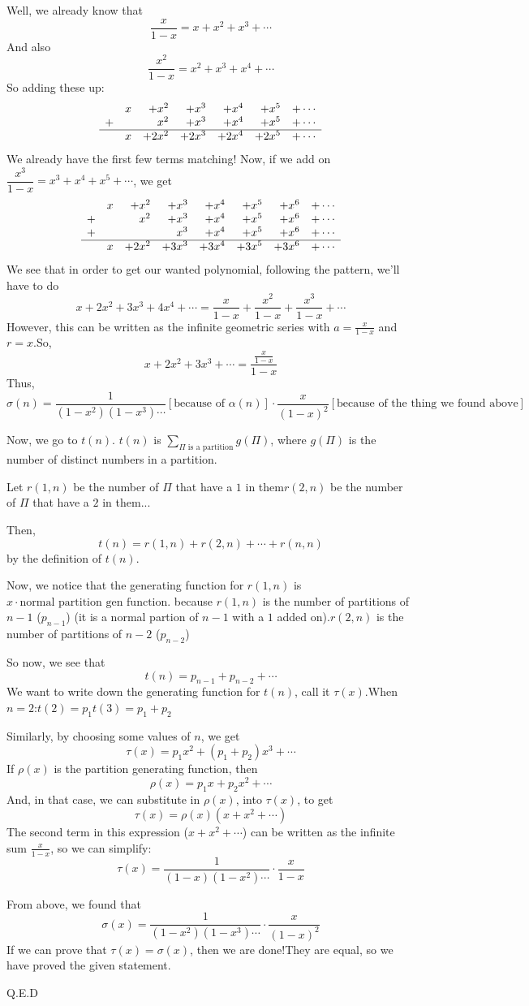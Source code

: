 \begin{enumerate}
 Well, we already know that 
 \[\frac{x}{1-x} = x+x^2+x^3 + \cdots\]And also 
 \[\frac{x^2}{1-x} = x^2+x^3+x^4+\cdots\]So adding these up:
 \[\begin{array}{rrrrrrr} & x & +x^2 & +x^3 & +x^4 & +x^5 & +\cdots \\ +&   & x^2 & +x^3 & +x^4 & +x^5 & +\cdots \\ \hline & x & +2x^2 & +2x^3 & +2x^4 & +2x^5 & +\cdots \end{array}\]We already have the first few terms matching! Now, if we add on $\dfrac{x^3}{1-x} = x^3+x^4+x^5+\cdots$, we get 
 \[\begin{array}{rrrrrrrr} & x & +x^2 & +x^3 & +x^4 & +x^5 & +x^6 & +\cdots \\ +&   & x^2 & +x^3 & +x^4 & +x^5 & +x^6 & +\cdots \\ +&   &     & x^3 & +x^4 & +x^5 & +x^6 & +\cdots \\ \hline & x & +2x^2 & +3x^3 & +3x^4 & +3x^5 & +3x^6 & +\cdots \end{array}\]We see that in order to get our wanted polynomial, following the pattern, we'll have to do 
 \[x+2x^2+3x^3+4x^4+\cdots = \frac{x}{1-x} + \frac{x^2}{1-x}+\frac{x^3}{1-x}+\cdots\]However, this can be written as the infinite geometric series with $a=\frac{x}{1-x}$ and $r=x$.So, 
 \[x+2x^2+3x^3+\cdots = \frac{\frac{x}{1-x}}{1-x}\]Thus, 
 \[\sigma(n) = \frac{1}{(1-x^2)(1-x^3)\cdots} [\text{because of }\alpha(n)] \cdot \frac{x}{(1-x)^2} [\text{because of the thing we found above}]\]

 Now, we go to $t(n)$. $t(n)$ is $\sum_{\Pi \text{ is a partition}} g(\Pi)$, where $g(\Pi)$ is the number of distinct numbers in a partition.

 Let $r(1,n)$ be the number of $\Pi$ that have a $1$ in them$r(2, n)$ be the number of $\Pi$ that have a $2$ in them...

 Then, 
 \[t(n) = r(1, n) + r(2,n) + \cdots + r(n,n)\]by the definition of $t(n)$.

 Now, we notice that the generating function for $r(1,n)$ is $x \cdot \text{normal partition gen function}$. because $r(1,n)$ is the number of partitions of $n-1$ ($p_{n-1}$) (it is a normal partion of $n-1$ with a $1$ added on).$r(2,n)$ is the number of partitions of $n-2$ ($p_{n-2}$)

 So now, we see that 
 \[t(n) = p_{n-1} + p_{n-2} + \cdots\]We want to write down the generating function for $t(n)$, call it $\tau(x)$.When $n=2$:$t(2)=p_1$$t(3)=p_1+p_2$

 Similarly, by choosing some values of $n$, we get 
 \[\tau(x) = p_1x^2 + (p_1+p_2)x^3+\cdots\]If $\rho(x)$ is the partition generating function, then 
 \[\rho(x) = p_1x+p_2x^2 + \cdots\]And, in that case, we can substitute in $\rho(x)$, into $\tau(x)$, to get 
 \[\tau(x) = \rho(x)(x+x^2+\cdots)\]The second term in this expression ($x+x^2+\cdots$) can be written as the infinite sum $\frac{x}{1-x}$, so we can simplify: 
 \[\tau(x)=\frac{1}{(1-x)(1-x^2)\cdots} \cdot \frac{x}{1-x}\]

 From above, we found that 
 \[\sigma(x) = \frac{1}{(1-x^2)(1-x^3)\cdots} \cdot \frac{x}{(1-x)^2}\]If we can prove that $\tau(x) = \sigma(x)$, then we are done!They are equal, so we have proved the given statement.

 Q.E.D

 


\end{enumerate}